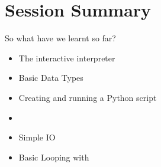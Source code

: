 \documentclass[14pt,compress]{beamer}
\newcommand{\kwrd}[1]{ \texttt{\textbf{\color{blue}{#1}}}  }
\begin{document}
\section{Session Summary}
\begin{frame}{So what have we learnt so far?}
  \begin{itemize}
    \item The interactive interpreter
    \item Basic Data Types
    \item Creating and running a Python script
    \item \kwrd{if/elif/else}
    \item Simple IO
    \item Basic Looping with \kwrd{while}
  \end{itemize}
\end{frame}
\end{document}
